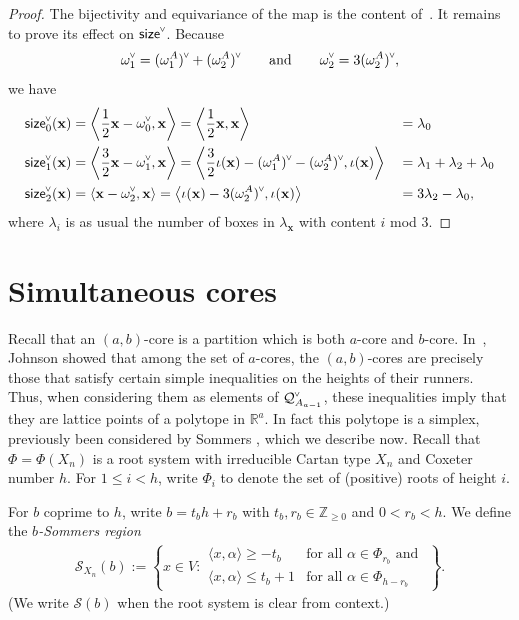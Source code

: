 \documentclass[ALCO,published]{cedram}
\newcommand{\darkblue}{\color{darkblue}} %
\newcommand{\defn}[1]{\emph{\darkblue #1}}
\newcommand{\chk}[1]{#1^{\normalfont\smash{\scalebox{.5}[.5]{\rotatebox{90}{\textbf{\textless}}}}}}
\newcommand{\Z}{\mathbb{Z}}
\newcommand{\Q}{\mathcal{Q}}
\newcommand{\Sommers}{\mathcal{S}}
\newcommand{\size}{{\sf size}}
\newcommand{\rat}{b}
\newcommand{\bt}{t_b}
\newcommand{\br}{r_b}
\begin{document}
\begin{proof}
The bijectivity and equivariance of the map is the content of~. It remains to prove its effect on $\chk{\size}$.
Because
\[
\chk{\omega_1} = \chk{(\omega_1^A)}+\chk{(\omega_2^A)}
\qquad\text{and}\qquad
\chk{\omega_2} = 3\chk{(\omega_2^A)},
\]
we have
\begin{align*}
\chk{\size}_0(\mathbf{x}) 
&= \left\langle \frac{1}{2}\mathbf{x}- \chk{\omega_0}, \mathbf{x} \right\rangle
= \left\langle \frac{1}{2}\mathbf{x}, \mathbf{x} \right\rangle
&&= \lambda_0
\\
\chk{\size}_1(\mathbf{x}) 
&= \left\langle \frac{3}{2}\mathbf{x}- \chk{\omega_1}, \mathbf{x} \right\rangle
= \left\langle \frac{3}{2}\iota(\mathbf{x}) - \chk{(\omega_1^A)} - \chk{(\omega_2^A)}, \iota(\mathbf{x}) \right\rangle 
&&= \lambda_1+\lambda_2+\lambda_0
\\
\chk{\size}_2(\mathbf{x}) 
&= \left\langle \mathbf{x}- \chk{\omega_2}, \mathbf{x} \right\rangle
= \left\langle \iota(\mathbf{x}) - 3\chk{(\omega_2^A)}, \iota(\mathbf{x}) \right\rangle 
&&= 3\lambda_2-\lambda_0,
\end{align*}
where $\lambda_i$ is as usual the number of boxes in $\lambda_\mathbf{x}$ with content $i$ mod $3$.
\end{proof}





\section{Simultaneous cores}
\label{sec:sommers}

Recall that an $(a,b)$-core is a partition which is both $a$-core and $b$-core. 
In~\cite[Lemma 3.1]{johnson2015lattice}, Johnson showed that among the set of $a$-cores, the $(a,b)$-cores are precisely those that satisfy certain simple inequalities on the heights of their runners. Thus, when considering them as elements of $\chk{\Q}_{A_{a-1}}$, these inequalities imply that they are lattice points of a polytope in $\mathbb{R}^a$. In fact this polytope is a simplex, previously been considered by Sommers \cite{sommers2005b}, which we describe now. Recall that $\Phi=\Phi(X_n)$ is a root system with irreducible Cartan type $X_n$ and Coxeter number $h$. For $1 \leq i < h$, write $\Phi_{i}$ to denote the set of (positive) roots of height $i$.

\begin{defi}
\label{def:sommers}
For $b$ coprime to $h$, write $\rat=\bt h+\br$ with $\bt,\br\in\Z_{\geq0}$ and $0<\br<h$.  We define the \defn{$b$-Sommers region} 
\begin{align*}
 \Sommers_{X_n}(b):=\left\{x\in V: \begin{array}{rl} \langle x,\alpha\rangle\geq-\bt & \text{for all }\alpha\in \Phi_{\br}\text{ and }\\
 \langle x,\alpha\rangle\leq \bt+1 &\text{for all }\alpha\in \Phi_{h-\br} \end{array} \right\}.
\end{align*}
(We write $\Sommers(b)$ when the root system is clear from context.)
\end{defi}
\end{document}

